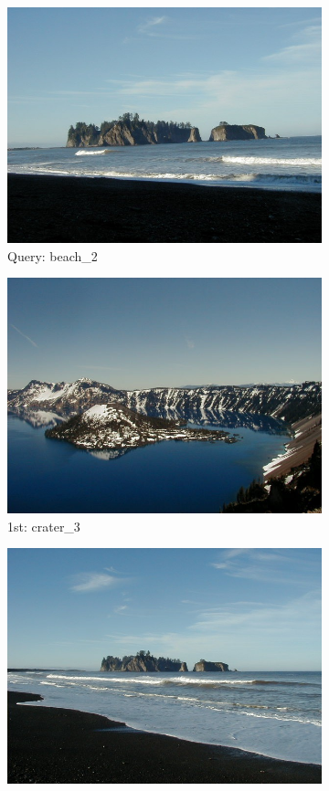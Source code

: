 \documentclass[10pt, a4paper]{article}
\begin{document}
\begin{itemize}
\begin{figure}[H]
	\centering
	\begin{subfigure}{0.25\textwidth}
	  \centering
	  \includegraphics[width=0.9\linewidth]{../input/beach_2.jpg}
	  \caption{Query: beach\_2}
	\end{subfigure}%
	\begin{subfigure}{0.25\textwidth}
	  \centering
	  \includegraphics[width=0.9\linewidth]{../input/crater_3.jpg}
	  \caption{1st: crater\_3}
	\end{subfigure}%
	\begin{subfigure}{0.25\textwidth}
        \centering
        \includegraphics[width=0.9\linewidth]{../input/beach_4.jpg}

\end{subfigure}
\end{figure}
\end{itemize}
\end{document}
